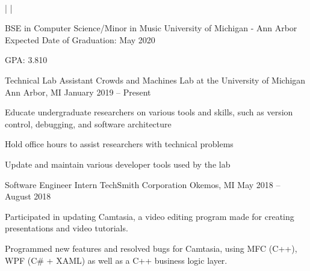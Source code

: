 \documentclass[]{awesome-cv}
\begin{document}
    
\begin{center}
	  \\

	{} | {} | {}
\end{center}
\vspace{-4mm}
\vspace{-2mm}
\cventry
	{BSE in Computer Science/Minor in Music}
	{University of Michigan - Ann Arbor}
	{}
	{Expected Date of Graduation: May 2020}
	{\begin{cvitems}
		\item{GPA: 3.810}
		\end{cvitems}}

\vspace{-5mm}
\vspace{-2mm}

	\cventry
	{Technical Lab Assistant}
	{Crowds and Machines Lab at the University of Michigan}
	{Ann Arbor, MI}
	{January 2019 – Present}
	{\begin{cvitems}
		\item {Educate undergraduate researchers on various tools and skills, such as version control, debugging, and software architecture}
		\item {Hold office hours to assist researchers with technical problems}
		\item {Update and maintain various developer tools used by the lab}
		\end{cvitems}}

	\vspace{-4mm}
	\cventry
	{Software Engineer Intern}
	{TechSmith Corporation}
	{Okemos, MI}
	{May 2018 – August 2018}
	{\begin{cvitems}
		\item {Participated in updating Camtasia, a video editing program made for creating presentations and video tutorials.}
		\item {Programmed new features and resolved bugs for Camtasia, using MFC (C++), WPF (C\# + XAML) as well as a C++ business logic layer.}
		\end{cvitems}}
\end{document}
